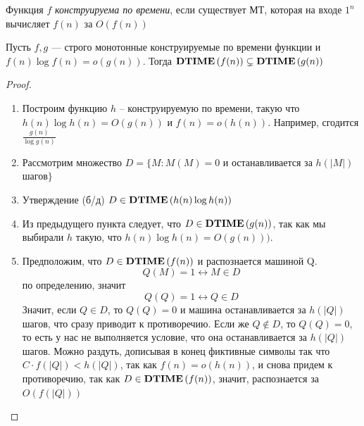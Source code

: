 \begin{definition}
Функция $f$ \textit{конструируема по времени}, если существует МТ, которая на входе $1^n$ вычисляет $f(n)$ за $O(f(n))$ 
\end{definition}
\begin{theorem}\label{th:hir-time}
Пусть $f, g$ --- строго монотонные конструируемые по времени функции и 
 \\$f(n)\log{f(n)} = o(g(n))$. Тогда $\textbf{DTIME}\left({f(n)}\right) \subsetneq \textbf{DTIME}\left({g(n)}\right)$
\end{theorem}
\begin{proof}
\begin{enumerate}
    \item Построим функцию $h$ -- конструируемую по времени, такую что $h(n)\log{h(n)} = O(g(n))$ и $f(n) = o(h(n))$. Например, сгодится $\frac{g(n)}{\log{g(n)}}$
     \item Рассмотрим множество $D = \{M: M(M)=0$ и останавливается за $h(|M|)$ шагов$\}$

     \item Утверждение (б/д) $D \in \textbf{DTIME}\left({h(n)\log{h(n)}}\right)$
     \item Из предыдущего пункта следует, что $D \in \textbf{DTIME}\left({g(n)}\right)$, так как мы выбирали $h$ такую, что $h(n)\log{h(n)} = O(g(n)))$.
     \item Предположим, что $D \in \textbf{DTIME}\left({f(n)}\right)$ и распознается машиной Q. 
     $$Q(M) = 1 \longleftrightarrow M \in D$$ по определению, значит 
     $$Q(Q) = 1  \longleftrightarrow Q \in D$$
     Значит, если $Q \in D$, то $Q(Q) = 0$ и машина останавливается за $h(|Q|)$ шагов, что сразу приводит к противоречию. Если же $Q \not\in D$, то $Q(Q) = 0$, то есть у нас не выполняется условие, что она останавливается за $h(|Q|)$ шагов. Можно раздуть, дописывая в конец фиктивные символы так что $C\cdot f(|Q|) < h(|Q|)$, так как $f(n) = o(h(n))$, и снова придем к противоречию, так как $D \in \textbf{DTIME}\left({f(n)}\right)$, значит, распознается за $O(f(|Q|))$\end{enumerate}
\end{proof}